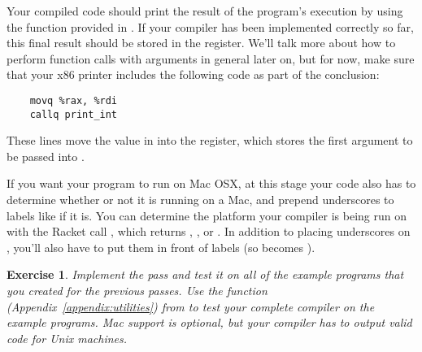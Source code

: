 \documentclass[11pt]{book}
\newtheorem{exercise}[theorem]{Exercise}
\begin{document}
Your compiled code should print the result of the program's execution by using the
 function provided in . If your compiler has been implemented correctly so far, this final result should be stored in the  register.
We'll talk more about
how to perform function calls with arguments in general later on, but
for now, make sure that your x86 printer includes the following code as part of the conclusion:

\begin{lstlisting}
    movq %rax, %rdi
    callq print_int
\end{lstlisting}

These lines move the value in  into the  register, which
stores the first argument to be passed into .

If you want your program to run on Mac OSX, at this stage your code also has to determine whether or not it is running on a Mac, and prepend underscores to labels like  if it is. 
You can determine the platform your compiler is being run on with the Racket 
call , which returns , , or .
In addition to placing underscores on , you'll also have to put them in front of 
 labels (so  becomes ).

\begin{exercise}
\normalfont Implement the  pass and test it on all of
the example programs that you created for the previous passes. Use the
 function (Appendix~\ref{appendix:utilities}) from
 to test your complete compiler on the example
programs. Mac support is optional, but your compiler has to output valid code for Unix machines.
\end{exercise}


\end{document}
